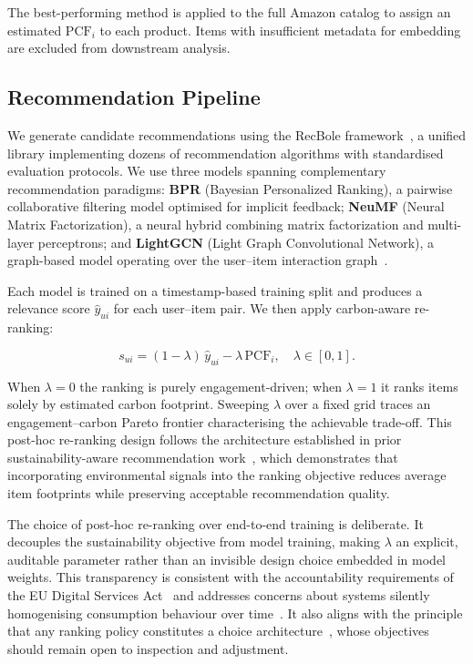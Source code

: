 \documentclass[11pt]{article}
\begin{document}
The best-performing method is applied to the full Amazon catalog to
assign an estimated $\mathrm{PCF}_i$ to each product. Items with insufficient metadata for embedding are excluded
from downstream analysis.

\subsection{Recommendation Pipeline}

We generate candidate recommendations using the RecBole
framework~\cite{recbole2021}, a unified library implementing dozens of
recommendation algorithms with standardised evaluation protocols. We use
three models spanning complementary recommendation paradigms: \textbf{BPR}
(Bayesian Personalized Ranking), a pairwise collaborative filtering model
optimised for implicit feedback; \textbf{NeuMF} (Neural Matrix
Factorization), a neural hybrid combining matrix factorization and
multi-layer perceptrons; and \textbf{LightGCN} (Light Graph Convolutional
Network), a graph-based model operating over the user--item interaction
graph~\cite{recbole2021}.

Each model is trained on a timestamp-based training split and produces a
relevance score $\hat{y}_{ui}$ for each user--item pair. We then apply
carbon-aware re-ranking:

\begin{equation}
s_{ui} = (1 - \lambda)\,\hat{y}_{ui} - \lambda\,\mathrm{PCF}_i,
\quad \lambda \in [0,1].
\end{equation}

When $\lambda = 0$ the ranking is purely engagement-driven; when
$\lambda = 1$ it ranks items solely by estimated carbon footprint.
Sweeping $\lambda$ over a fixed grid traces an engagement--carbon Pareto
frontier characterising the achievable trade-off. This post-hoc re-ranking
design follows the architecture established in prior sustainability-aware
recommendation work~\cite{spillo2023greenerrec, spillo2023sustainabilityaware,
ecoa2026, vicenti2026pcfllm}, which demonstrates that incorporating
environmental signals into the ranking objective reduces average item
footprints while preserving acceptable recommendation quality.

The choice of post-hoc re-ranking over end-to-end training is deliberate.
It decouples the sustainability objective from model training, making
$\lambda$ an explicit, auditable parameter rather than an invisible design
choice embedded in model weights. This transparency is consistent with the
accountability requirements of the EU Digital Services Act~\cite{dsa2022}
and addresses concerns about systems silently homogenising consumption
behaviour over time~\cite{chaney2018confounding}. It also aligns with the
principle that any ranking policy constitutes a choice
architecture~\cite{bonicalzi2023autonomy}, whose objectives should remain
open to inspection and adjustment.
\end{document}
